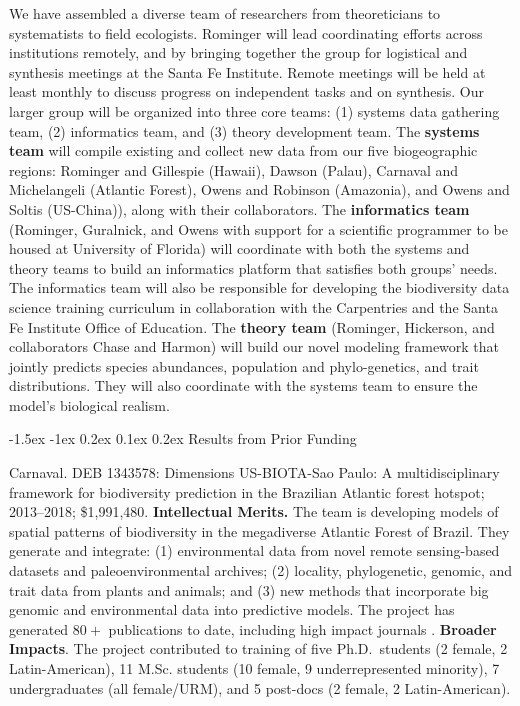 \documentclass[11pt]{article}
\makeatletter
\renewcommand\section{\@startsection{section}{1}{\z@}%
                                  {-1.5ex \@plus -1ex \@minus 0.2ex}%
                                  {0.1ex \@plus 0.2ex}%
                                  {\normalfont\Large\bfseries}}
\renewcommand{\paragraph}{\@startsection{paragraph}{4}{\z@}
  {1.5ex \@plus 1ex \@minus .2ex}{-1em}
  {\normalfont\normalsize\it}
}
\makeatother
\begin{document}
We have assembled a diverse team of researchers from theoreticians to
systematists to field ecologists. Rominger will lead coordinating
efforts across institutions remotely, and by bringing together the
group for logistical and synthesis meetings at the Santa Fe
Institute. Remote meetings will be held at least monthly to discuss
progress on independent tasks and on synthesis. Our larger group will
be organized into three core teams: (1) systems data gathering team,
(2) informatics team, and (3) theory development team. The
\textbf{systems team} will compile existing and collect new data from
our five biogeographic regions: Rominger and Gillespie (Hawaii),
Dawson (Palau), Carnaval and Michelangeli (Atlantic Forest), Owens and
Robinson (Amazonia), and Owens and Soltis (US-China)), along with
their collaborators. The \textbf{informatics team} (Rominger,
Guralnick, and Owens with support for a scientific programmer to be
housed at University of Florida) will coordinate with both the systems
and theory teams to build an informatics platform that satisfies both
groups' needs. The informatics team will also be responsible for
developing the biodiversity data science training curriculum in
collaboration with the Carpentries and the Santa Fe Institute Office of
Education. The \textbf{theory team} (Rominger, Hickerson, and
collaborators Chase and Harmon) will build our novel modeling
framework that jointly predicts species abundances, population and
phylo-genetics, and trait distributions. They will also coordinate
with the systems team to ensure the model's biological realism.

\section{Results from Prior Funding} \label{results-from-prior-funding}

\paragraph{Carnaval.} DEB 1343578: Dimensions US-BIOTA-Sao Paulo: A
multidisciplinary framework for biodiversity prediction in the Brazilian
Atlantic forest hotspot; 2013--2018; \$1,991,480. \textbf{Intellectual
Merits.} The team is developing models of spatial patterns of
biodiversity in the megadiverse Atlantic Forest of Brazil. They generate
and integrate: (1) environmental data from novel remote sensing-based
datasets and paleoenvironmental archives; (2) locality, phylogenetic,
genomic, and trait data from plants and animals; and (3) new methods
that incorporate big genomic and environmental data into predictive
models. The project has generated $80+$ publications to date,
including high impact journals
\cite{Do_Amaral2016-bi,Prates2016-at,Prates2016-gr,Maestri2016-bp,Zamborlini_Saiter2016-zu,Montade2016-wl,Bernal2016-pd,Bustamante2016-qt,Gu2017-oz}.
\textbf{Broader Impacts}. The project contributed to training of five
Ph.D.~students (2 female, 2 Latin-American), 11 M.Sc. students (10
female, 9 underrepresented minority), 7 undergraduates (all female/URM),
and 5 post-docs (2 female, 2 Latin-American).
\end{document}
